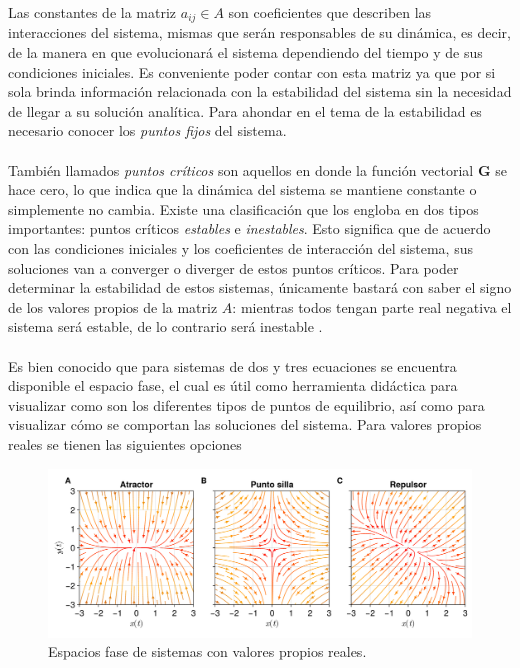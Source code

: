 Las constantes de la matriz $a_{ij}\in A$ son coeficientes que describen las interacciones del sistema, mismas que serán responsables de su dinámica, es decir, de la manera en que evolucionará el sistema dependiendo del tiempo y de sus condiciones iniciales. Es conveniente poder contar con esta matriz ya que por si sola brinda información relacionada con la estabilidad del sistema sin la necesidad de llegar a su solución analítica. Para ahondar en el tema de la estabilidad es necesario conocer los \textit{puntos fijos} del sistema.
\\
\\
También llamados \textit{puntos críticos} son aquellos en donde la función vectorial $\textbf{G}$ se hace cero, lo que indica que la dinámica del sistema se mantiene constante o simplemente no cambia. Existe una clasificación que los engloba en dos tipos importantes: puntos críticos \textit{estables} e \textit{inestables}. Esto significa que de acuerdo con las condiciones iniciales y los coeficientes de interacción del sistema, sus soluciones van a converger o diverger de estos puntos críticos. Para poder determinar la estabilidad de estos sistemas, únicamente bastará con saber el signo de los valores propios de la matriz $A$: mientras todos tengan parte real negativa el sistema será estable, de lo contrario será inestable \cite{hirsch2013differential}.\\
\\
Es bien conocido que para sistemas de dos y tres ecuaciones se encuentra disponible el espacio fase, el cual es útil como herramienta didáctica para visualizar como son los diferentes tipos de puntos de equilibrio, así como para visualizar cómo se comportan las soluciones del sistema. Para valores propios reales se tienen las siguientes opciones
	\begin{figure}[h!]
	\centering
	\includegraphics[scale=0.23]{../Imagenes/Espacios fase reales}
	\caption{Espacios fase de sistemas con valores propios reales.}
	\label{fig:EFReales}
\end{figure}

